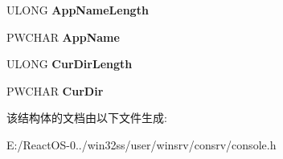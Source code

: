 \begin{DoxyCompactItemize}
U\+L\+O\+NG {\bfseries App\+Name\+Length}
\item 
\mbox{\label{struct___c_o_n_s_o_l_e___i_n_i_t___i_n_f_o_aef4b4847240ec9bf0656475a3cc6c855}} 
P\+W\+C\+H\+AR {\bfseries App\+Name}
\item 
\mbox{\label{struct___c_o_n_s_o_l_e___i_n_i_t___i_n_f_o_a2a959a0405104a05b4d0c3e799ae895b}} 
U\+L\+O\+NG {\bfseries Cur\+Dir\+Length}
\item 
\mbox{\label{struct___c_o_n_s_o_l_e___i_n_i_t___i_n_f_o_a6dee90bdbad4d895114573a3653f3f5e}} 
P\+W\+C\+H\+AR {\bfseries Cur\+Dir}
\end{DoxyCompactItemize}


该结构体的文档由以下文件生成\+:\begin{DoxyCompactItemize}
\item 
E\+:/\+React\+O\+S-\/0../win32ss/user/winsrv/consrv/console.\+h\end{DoxyCompactItemize}
